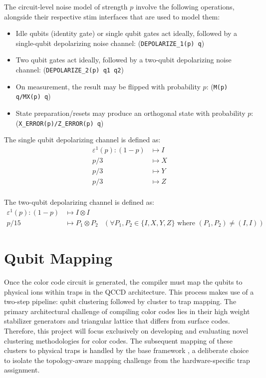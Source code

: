 The circuit-level noise model of strength $p$ involve the following operations, alongside their respective stim interfaces that are used to model them:
\begin{itemize}
    \item Idle qubits (identity gate) or single qubit gates act ideally, followed by a single-qubit depolarizing noise channel: \newline(\texttt{DEPOLARIZE_1(p) q})
    \item Two qubit gates act ideally, followed by a two-qubit depolarizing noise channel: \newline(\texttt{DEPOLARIZE_2(p) q1 q2})
    \item On measurement, the result may be flipped with probability $p$: \newline(\texttt{M(p) q/MX(p) q})
    \item State preparation/resets may produce an orthogonal state with probability $p$: \newline(\texttt{X_ERROR(p)/Z_ERROR(p) q})
\end{itemize}

The single qubit depolarizing channel is defined as:
\begin{align}
    \varepsilon^1(p): (1-p) &\mapsto I\\
    p/3 &\mapsto X\\
    p/3 &\mapsto Y\\
    p/3 &\mapsto Z\\
\end{align}

The two-qubit depolarizing channel is defined as:
\begin{align}
    \varepsilon^1(p): (1-p) &\mapsto I\otimes I\\
    p/15 &\mapsto P_1\otimes P_2  & (\forall P_1,P_2 \in \{I,X,Y,Z\}\text{ where } (P_1,P_2) \neq (I,I))
\end{align}

\section{Qubit Mapping}
\label{sec:impl_qubit_mapping}

Once the color code circuit is generated, the compiler must map the qubits to physical ions within traps in the QCCD architecture. This process makes use of a two-step pipeline: qubit clustering followed by cluster to trap mapping. 
The primary architectural challenge of compiling color codes lies in their high weight stabilizer generators and triangular lattice that differs from surface codes. Therefore, this project will focus exclusively on developing and evaluating novel clustering methodologies for color codes. The subsequent mapping of these clusters to physical traps is handled by the base framework \cite{scottPaper}, a deliberate choice to isolate the topology-aware mapping challenge from the hardware-specific trap assignment.

